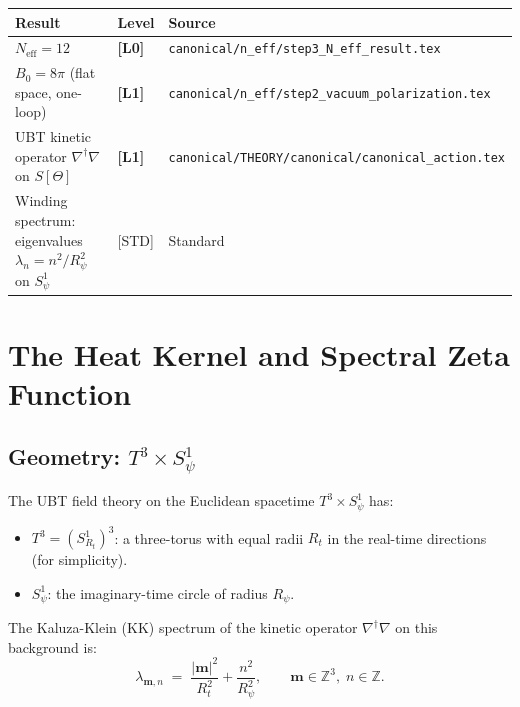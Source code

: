 \documentclass[12pt,a4paper]{article}
\theoremstyle{definition}
\theoremstyle{remark}
\newcommand{\Lzero}{\textbf{[L0]}}
\newcommand{\Lone}{\textbf{[L1]}}
\newcommand{\ZZ}{\mathbb{Z}}
\begin{document}
\begin{tcolorbox}[colback=green!5!white,colframe=green!50!black,
  title={Pre-Proved Inputs}]
\begin{center}
\begin{tabular}{lll}
\toprule
\textbf{Result} & \textbf{Level} & \textbf{Source} \\
\midrule
$N_{\mathrm{eff}} = 12$ & \Lzero & \texttt{canonical/n\_eff/step3\_N\_eff\_result.tex} \\
$B_0 = 8\pi$ (flat space, one-loop) & \Lone & \texttt{canonical/n\_eff/step2\_vacuum\_polarization.tex} \\
UBT kinetic operator $\nabla^\dagger\nabla$ on $S[\Theta]$ & \Lone & \texttt{canonical/THEORY/canonical/canonical\_action.tex} \\
Winding spectrum: eigenvalues $\lambda_n = n^2/R_\psi^2$ on $S^1_\psi$ & [STD] & Standard \\
\bottomrule
\end{tabular}
\end{center}
\end{tcolorbox}

\section{The Heat Kernel and Spectral Zeta Function}
\label{sec:heatkernel}

\subsection{Geometry: $T^3 \times S^1_\psi$}

The UBT field theory on the Euclidean spacetime $T^3 \times S^1_\psi$ has:
\begin{itemize}
  \item $T^3 = (S^1_{R_t})^3$: a three-torus with equal radii $R_t$ in the
        real-time directions (for simplicity).
  \item $S^1_\psi$: the imaginary-time circle of radius $R_\psi$.
\end{itemize}

The Kaluza-Klein (KK) spectrum of the kinetic operator
$\nabla^\dagger\nabla$ on this background is:
\begin{equation}
\label{eq:spectrum}
  \lambda_{\mathbf{m},n}
  \;=\;
  \frac{|\mathbf{m}|^2}{R_t^2} + \frac{n^2}{R_\psi^2},
  \qquad \mathbf{m} \in \ZZ^3,\; n \in \ZZ.
\end{equation}
\end{document}
